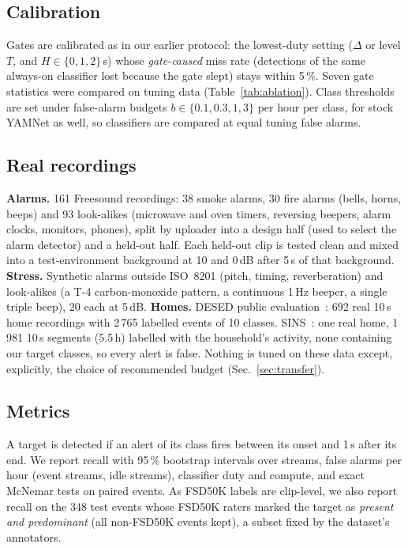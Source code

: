 \documentclass[conference]{IEEEtran}
\begin{document}
\subsection{Calibration}
Gates are calibrated as in our earlier protocol: the lowest-duty setting ($\Delta$ or level $T$, and $H\in\{0,1,2\}$\,s)
whose \emph{gate-caused} miss rate (detections of the same always-on classifier lost because the gate slept) stays within
5\,\%. Seven gate statistics were compared on tuning data (Table~\ref{tab:ablation}). Class thresholds are set under
false-alarm budgets $b\in\{0.1,0.3,1,3\}$ per hour per class, for stock YAMNet as well, so classifiers are compared at
equal tuning false alarms.

\subsection{Real recordings}\label{sec:real}
\textbf{Alarms.} 161 Freesound recordings: 38 smoke alarms, 30 fire alarms (bells, horns, beeps) and 93 look-alikes
(microwave and oven timers, reversing beepers, alarm clocks, monitors, phones), split by uploader into a design half (used
to select the alarm detector) and a held-out half. Each held-out clip is tested clean and mixed into a test-environment
background at 10 and 0\,dB after 5\,s of that background. \textbf{Stress.} Synthetic alarms outside ISO~8201 (pitch,
timing, reverberation) and look-alikes (a T-4 carbon-monoxide pattern, a continuous 1\,Hz beeper, a single triple beep),
20 each at 5\,dB. \textbf{Homes.} DESED public evaluation~\cite{turpault2019desed}: 692 real 10\,s home recordings with
2\,765 labelled events of 10 classes. SINS~\cite{dekkers2017sins,dekkers2018dcase}: one real home, 1\,981 10\,s segments
(5.5\,h) labelled with the household's activity, none containing our target classes, so every alert is false. Nothing is
tuned on these data except, explicitly, the choice of recommended budget (Sec.~\ref{sec:transfer}).

\subsection{Metrics}
A target is detected if an alert of its class fires between its onset and 1\,s after its end. We report recall with 95\,\%
bootstrap intervals over streams, false alarms per hour (event streams, idle streams), classifier duty and compute, and
exact McNemar tests on paired events. As FSD50K labels are clip-level, we also report recall on the 348 test events whose
FSD50K raters marked the target as \emph{present and predominant} (all non-FSD50K events kept), a subset fixed by the
dataset's annotators.
\end{document}
